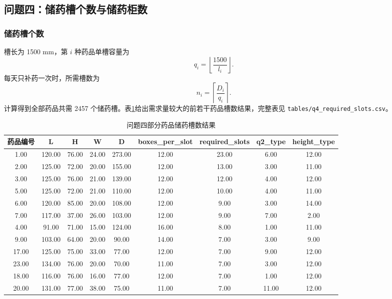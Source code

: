 \documentclass[UTF8,a4paper,12pt]{ctexart}
\begin{document}
\subsection{问题四：储药槽个数与储药柜数}
\subsubsection{储药槽个数}
槽长为 1500 mm，第 $i$ 种药品单槽容量为
\begin{equation}
q_i=\left\lfloor\frac{1500}{l_i}\right\rfloor.
\end{equation}
每天只补药一次时，所需槽数为
\begin{equation}
n_i=\left\lceil\frac{D_i}{q_i}\right\rceil.
\end{equation}
计算得到全部药品共需 2457 个储药槽。表\ref{tab:q4}给出需求量较大的前若干药品槽数结果，完整表见 \texttt{tables/q4\_required\_slots.csv}。
\begin{table}[H]\centering
\small
\caption{问题四部分药品储药槽数结果}\label{tab:q4}
\begin{tabular}{ccccccccc}\toprule
药品编号 & L & H & W & D & boxes\_per\_slot & required\_slots & q2\_type & height\_type\\\midrule
1.00 & 120.00 & 76.00 & 24.00 & 273.00 & 12.00 & 23.00 & 6.00 & 12.00\\
2.00 & 125.00 & 72.00 & 20.00 & 155.00 & 12.00 & 13.00 & 3.00 & 11.00\\
3.00 & 125.00 & 76.00 & 21.00 & 139.00 & 12.00 & 12.00 & 4.00 & 12.00\\
5.00 & 125.00 & 72.00 & 21.00 & 110.00 & 12.00 & 10.00 & 4.00 & 11.00\\
6.00 & 120.00 & 85.00 & 20.00 & 108.00 & 12.00 & 9.00 & 3.00 & 14.00\\
7.00 & 117.00 & 37.00 & 26.00 & 103.00 & 12.00 & 9.00 & 7.00 & 2.00\\
4.00 & 91.00 & 71.00 & 15.00 & 124.00 & 16.00 & 8.00 & 1.00 & 11.00\\
9.00 & 103.00 & 64.00 & 20.00 & 90.00 & 14.00 & 7.00 & 3.00 & 9.00\\
17.00 & 125.00 & 75.00 & 33.00 & 77.00 & 12.00 & 7.00 & 9.00 & 12.00\\
23.00 & 134.00 & 76.00 & 20.00 & 70.00 & 11.00 & 7.00 & 3.00 & 12.00\\
18.00 & 116.00 & 76.00 & 16.00 & 77.00 & 12.00 & 7.00 & 1.00 & 12.00\\
20.00 & 131.00 & 77.00 & 38.00 & 75.00 & 11.00 & 7.00 & 11.00 & 12.00\\
\bottomrule\end{tabular}
\end{table}
\end{document}

